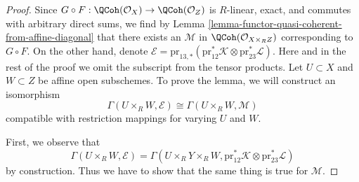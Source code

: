 \begin{proof}
Since $G \circ F : \QCoh(\mathcal{O}_X) \to \QCoh(\mathcal{O}_Z)$
is $R$-linear, exact, and commutes with arbitrary direct sums,
we find by Lemma \ref{lemma-functor-quasi-coherent-from-affine-diagonal}
that there exists an $\mathcal{M}$ in
$\QCoh(\mathcal{O}_{X \times_R Z})$ corresponding to $G \circ F$.
On the other hand, denote
$\mathcal{E} = \text{pr}_{13, *}(\text{pr}_{12}^*\mathcal{K}
\otimes \text{pr}_{23}^*\mathcal{L})$. Here and in the rest of
the proof we omit the subscript from the tensor products.
Let $U \subset X$ and $W \subset Z$ be affine open subschemes.
To prove the lemma, we will construct an isomorphism
$$
\Gamma(U \times_R W, \mathcal{E})
\cong
\Gamma(U \times_R W, \mathcal{M})
$$
compatible with restriction mappings for varying $U$ and $W$.

\medskip\noindent
First, we observe that
$$
\Gamma(U \times_R W, \mathcal{E}) =
\Gamma(U \times_R Y \times_R W,
\text{pr}_{12}^*\mathcal{K} \otimes \text{pr}_{23}^*\mathcal{L})
$$
by construction. Thus we have to show that the same thing is true
for $\mathcal{M}$.


\end{proof}
